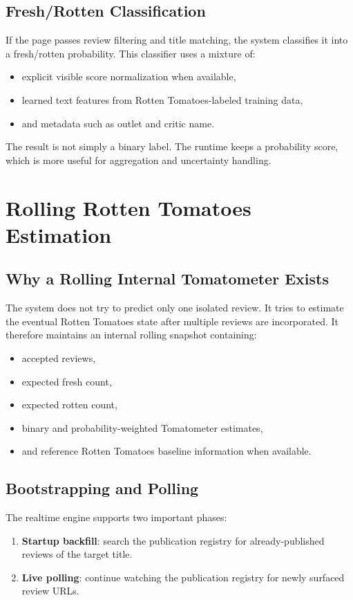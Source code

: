 \documentclass[11pt]{article}
\begin{document}
\subsection{Fresh/Rotten Classification}
If the page passes review filtering and title matching, the system classifies it into a fresh/rotten probability. This classifier uses a mixture of:
\begin{itemize}[leftmargin=1.5em]
    \item explicit visible score normalization when available,
    \item learned text features from Rotten Tomatoes-labeled training data,
    \item and metadata such as outlet and critic name.
\end{itemize}

The result is not simply a binary label. The runtime keeps a probability score, which is more useful for aggregation and uncertainty handling.

\section{Rolling Rotten Tomatoes Estimation}
\subsection{Why a Rolling Internal Tomatometer Exists}
The system does not try to predict only one isolated review. It tries to estimate the eventual Rotten Tomatoes state after multiple reviews are incorporated. It therefore maintains an internal rolling snapshot containing:
\begin{itemize}[leftmargin=1.5em]
    \item accepted reviews,
    \item expected fresh count,
    \item expected rotten count,
    \item binary and probability-weighted Tomatometer estimates,
    \item and reference Rotten Tomatoes baseline information when available.
\end{itemize}

\subsection{Bootstrapping and Polling}
The realtime engine supports two important phases:
\begin{enumerate}[leftmargin=1.5em]
    \item \textbf{Startup backfill}: search the publication registry for already-published reviews of the target title.
    \item \textbf{Live polling}: continue watching the publication registry for newly surfaced review URLs.
\end{enumerate}
\end{document}
